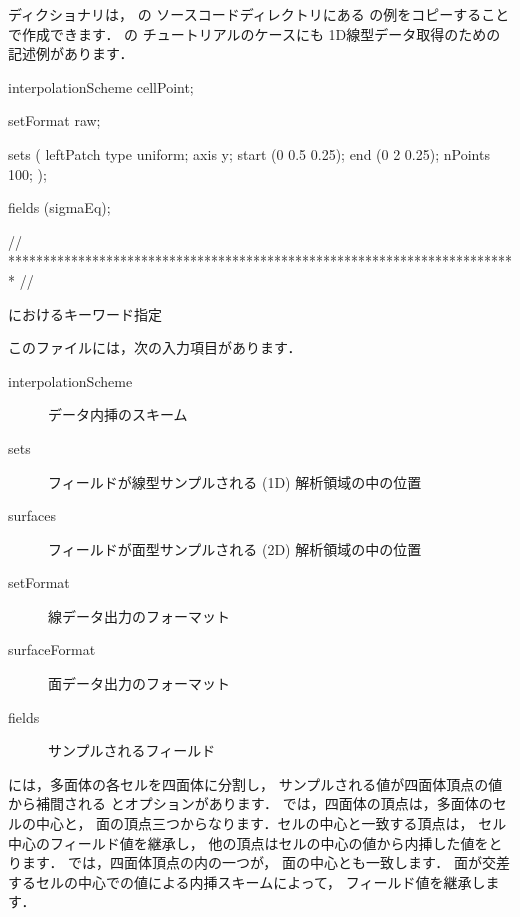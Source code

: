 ディクショナリは，
の
ソースコードディレクトリにある
\/の例をコピーすることで作成できます．
\/の
チュートリアルのケースにも
1D線型データ取得のための記述例があります．
\begin{OFverbatim}[file, linenum=17]

interpolationScheme cellPoint;

setFormat       raw;

sets
(
    leftPatch
    {
        type    uniform;
        axis    y;
        start   (0 0.5 0.25);
        end     (0 2 0.25);
        nPoints 100;
    }
);

fields          (sigmaEq);


// ************************************************************************* //
\end{OFverbatim}


\begin{table}[ht]
 
 \caption{におけるキーワード指定}
 \label{tbl:6.3}
\end{table}


このファイルには，次の入力項目があります．
\begin{description}
 \item[interpolationScheme] データ内挿のスキーム
 \item[sets] フィールドが線型サンプルされる (1D) 解析領域の中の位置
 \item[surfaces] フィールドが面型サンプルされる (2D) 解析領域の中の位置
 \item[setFormat] 線データ出力のフォーマット
 \item[surfaceFormat] 面データ出力のフォーマット
 \item[fields] サンプルされるフィールド
\end{description}

には，多面体の各セルを四面体に分割し，
サンプルされる値が四面体頂点の値から補間される
とオプションがあります．
では，四面体の頂点は，多面体のセルの中心と，
面の頂点三つからなります．セルの中心と一致する頂点は，
セル中心のフィールド値を継承し，
他の頂点はセルの中心の値から内挿した値をとります．
では，四面体頂点の内の一つが，
面の中心とも一致します．
面が交差するセルの中心での値による内挿スキームによって，
フィールド値を継承します．

